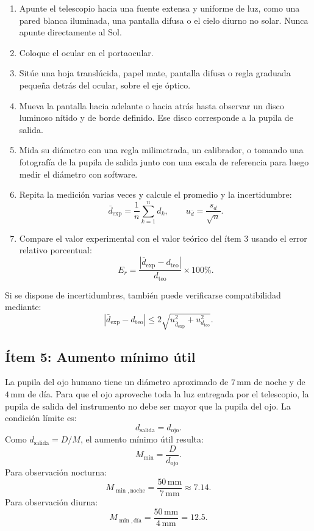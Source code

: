 \begin{enumerate}
    \item Apunte el telescopio hacia una fuente extensa y uniforme de luz, como una pared blanca iluminada, una pantalla difusa o el cielo diurno no solar. Nunca apunte directamente al Sol.
    \item Coloque el ocular en el portaocular.
    \item Sitúe una hoja translúcida, papel mate, pantalla difusa o regla graduada pequeña detrás del ocular, sobre el eje óptico.
    \item Mueva la pantalla hacia adelante o hacia atrás hasta observar un disco luminoso nítido y de borde definido. Ese disco corresponde a la pupila de salida.
    \item Mida su diámetro con una regla milimetrada, un calibrador, o tomando una fotografía de la pupila de salida junto con una escala de referencia para luego medir el diámetro con software.
    \item Repita la medición varias veces y calcule el promedio y la incertidumbre:
$$
\bar{d}_{\mathrm{exp}}=\frac{1}{n}\sum_{k=1}^{n}d_k,
\qquad
u_{\bar{d}}=\frac{s_d}{\sqrt{n}}.
$$
    \item Compare el valor experimental con el valor teórico del ítem 3 usando el error relativo porcentual:
$$
E_r=\frac{\left|\bar{d}_{\mathrm{exp}}-d_{\mathrm{teo}}\right|}{d_{\mathrm{teo}}}\times 100\%.
$$
\end{enumerate}



Si se dispone de incertidumbres, también puede verificarse compatibilidad mediante:
$$
\left|\bar{d}_{\mathrm{exp}}-d_{\mathrm{teo}}\right|
\leq
2\sqrt{u_{\bar{d}_{\mathrm{exp}}}^2+u_{d_{\mathrm{teo}}}^2}.
$$

\subsection{Ítem 5: Aumento mínimo útil}

La pupila del ojo humano tiene un diámetro aproximado de $7\,\mathrm{mm}$ de noche y de $4\,\mathrm{mm}$ de día. Para que el ojo aproveche toda la luz entregada por el telescopio, la pupila de salida del instrumento no debe ser mayor que la pupila del ojo. La condición límite es:
$$
d_{\mathrm{salida}}=d_{\mathrm{ojo}}.
$$
Como $d_{\mathrm{salida}}=D/M$, el aumento mínimo útil resulta:
$$
M_{\min}=\frac{D}{d_{\mathrm{ojo}}}.
$$
Para observación nocturna:
$$
M_{\min,\mathrm{noche}}=\frac{50\,\mathrm{mm}}{7\,\mathrm{mm}}\approx 7.14.
$$
Para observación diurna:
$$
M_{\min,\text{día}}=\frac{50\,\mathrm{mm}}{4\,\mathrm{mm}}=12.5.
$$

